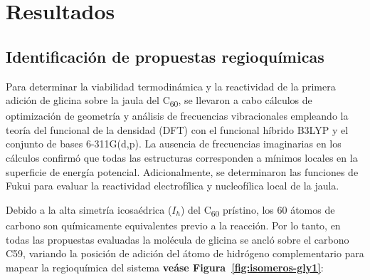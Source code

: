 
                                                                                                                                                                                                                                                                                                                                                                                                                                                                                                                                                                                                                                                                                                                                                                                                                                                                                                                                                                                                                                                                                                                                                                                                                                 \chapter{Resultados}
\section{Identificación de propuestas regioquímicas}

Para determinar la viabilidad termodinámica y la reactividad de la primera adición de glicina sobre la jaula del C\textsubscript{60}, se llevaron a cabo cálculos de optimización de geometría y análisis de frecuencias vibracionales empleando la teoría del funcional de la densidad (DFT) con el funcional híbrido B3LYP y el conjunto de bases 6-311G(d,p). La ausencia de frecuencias imaginarias en los cálculos confirmó que todas las estructuras corresponden a mínimos locales en la superficie de energía potencial. Adicionalmente, se determinaron las funciones de Fukui para evaluar la reactividad electrofílica y nucleofílica local de la jaula.

Debido a la alta simetría icosaédrica ($I_h$) del C\textsubscript{60} prístino, los 60 átomos de carbono son químicamente equivalentes previo a la reacción. Por lo tanto, en todas las propuestas evaluadas la molécula de glicina se ancló sobre el carbono C59, variando la posición de adición del átomo de hidrógeno complementario para mapear la regioquímica del sistema  \textbf{veáse Figura~\ref{fig:isomeros-gly1}}:

